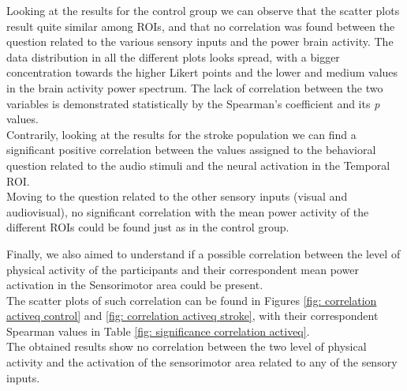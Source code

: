 Looking at the results for the control group we can observe that the scatter plots result quite similar among ROIs, and that no correlation was found between the question related to the various sensory inputs and the power brain activity. The data distribution in all the different plots looks spread, with a bigger concentration towards the higher Likert points and the lower and medium values in the brain activity power spectrum. The lack of correlation between the two variables is demonstrated statistically by the Spearman's coefficient and its \textit{p} values. \\
Contrarily, looking at the results for the stroke population we can find a significant positive correlation between the values assigned to the behavioral question related to the audio stimuli and the neural activation in the Temporal ROI. \\
Moving to the question related to the other sensory inputs (visual and audiovisual), no significant correlation with the mean power activity of the different ROIs could be found just as in the control group.

Finally, we also aimed to understand if a possible correlation between the level of physical activity of the participants and their correspondent mean power activation in the Sensorimotor area could be present. \\
The scatter plots of such correlation can be found in Figures \ref{fig: correlation activeq control} and \ref{fig: correlation activeq stroke}, with their correspondent Spearman values in Table \ref{fig: significance correlation activeq}. \\
The obtained results show no correlation between the two level of physical activity and the activation of the sensorimotor area related to any of the sensory inputs.